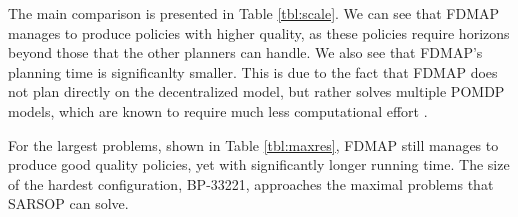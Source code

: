\documentclass[letterpaper]{article} %
\theoremstyle{definition}
\newcommand{\guy}[1]{\textbf{[\color{orange}GUY:#1]}}
\begin{document}
\begin{table}
\centering
\scriptsize
    \caption{\label{tbl:small} Results for BP-21210. FDMAP outputs a reasonable value compared to GMAA-ICE, which optimizes the small scaled problem. The last row presents results for the maximal horizon reached on DP-JESP and GMAA-ICE, and average simulations steps until reaching the goal state for FDMAP when run for unbounded number of steps. These are specified in parentheses next to the policy value}
\end{table}


The main comparison is presented in Table \ref{tbl:scale}. We can see that FDMAP manages to produce policies with higher quality, as these policies require horizons beyond those that the other planners can handle. We also see that FDMAP's planning time is significanlty smaller.
 This is due to the fact that FDMAP does not plan directly on the decentralized model, but rather solves multiple POMDP models, which are known to require much less computational effort \cite{DECPOMDPCOMP}.

For the largest problems, shown in Table \ref{tbl:maxres}, FDMAP still manages to produce good quality policies, yet with significantly longer running time. The size of the hardest configuration, BP-33221, approaches the maximal problems that SARSOP \cite{SARSOP} can solve.
\end{document}

